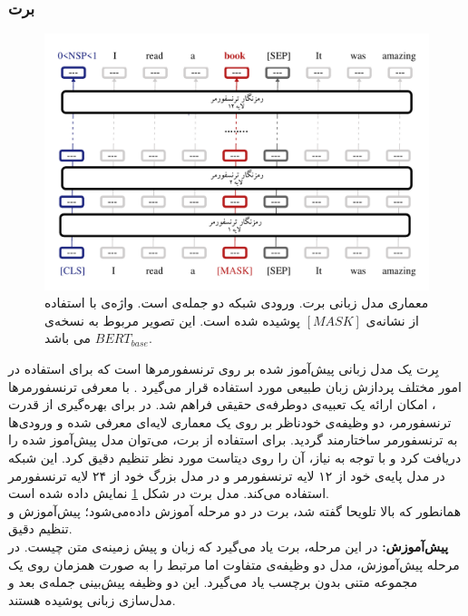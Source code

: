 \subsubsection{برت}
\begin{figure}[!htb]
	\centering
	\includegraphics[scale=0.8]{Figures/bert.pdf}
	\caption[معماری مدل زبانی برت]{معماری مدل زبانی برت. ورودی شبکه دو جمله‌ی  است. واژه‌ی  با استفاده از نشانه‌ی $[MASK]$ پوشیده شده است. این تصویر مربوط به نسخه‌ی $BERT_{base}$ می باشد.}
	\label{Fig:bert}
\end{figure}
بِرت 
یک مدل زبانی پیش‌آموز شده بر روی ترنسفورمرها است که برای استفاده در امور مختلف پردازش زبان طبیعی مورد استفاده قرار می‌گیرد \cite{bert}. با معرفی ترنسفورمرها \cite{transformer}، امکان ارائه یک تعبیه‌ی دوطرفه‌ی حقیقی فراهم شد. در \cite{bert} برای بهره‌گیری از قدرت ترنسفورمر، دو وظیفه‌ی خودناظر بر روی یک معماری لایه‌ای معرفی شده و ورودی‌ها به ترنسفورمر ساختارمند گردید. برای استفاده از برت، می‌توان مدل پیش‌آموز شده را دریافت کرد و با توجه به نیاز، آن را روی دیتاست مورد نظر تنظیم دقیق کرد. این شبکه در مدل پایه‌ی خود از ۱۲ لایه ترنسفورمر و در مدل بزرگ خود از ۲۴ لایه ترنسفورمر استفاده می‌کند. مدل برت در شکل \ref{Fig:bert} نمایش داده شده است.\\
  همانطور که بالا تلویحا گفته شد، برت در دو مرحله آموزش داده‌می‌شود؛ پیش‌آموزش و تنظیم دقیق.\\
\textbf{پیش‌آموزش:}
 در این مرحله،‌ برت یاد می‌گیرد که زبان و پیش زمینه‌ی متن چیست. در مرحله پیش‌آموزش، مدل دو وظیفه‌ی متفاوت اما مرتبط را به صورت همزمان روی یک مجموعه متنی بدون برچسب یاد می‌گیرد. این دو وظیفه پیش‌بینی جمله‌ی بعد  و مدل‌سازی زبانی پوشیده هستند.\\
